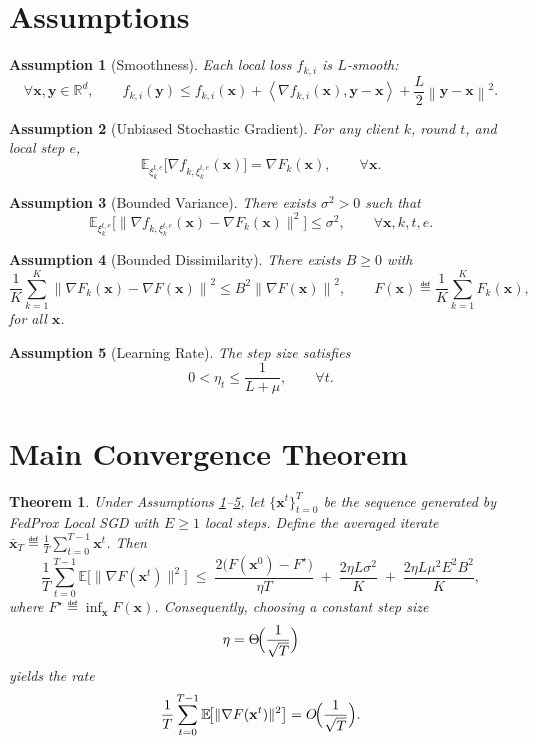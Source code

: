\documentclass{article}
\newtheorem{assumption}{Assumption}
\newtheorem{theorem}{Theorem}
\newcommand{\E}{\mathbb{E}}
\newcommand{\norm}[1]{\left\lVert #1 \right\rVert}
\newcommand{\inner}[2]{\left\langle #1,#2 \right\rangle}
\begin{document}
\section*{Assumptions}
\begin{assumption}[Smoothness]\label{ass:smooth}
Each local loss $f_{k,i}$ is $L$‑smooth:
\[
\forall \mathbf{x},\mathbf{y}\in\mathbb{R}^d,\qquad
f_{k,i}(\mathbf{y})\le f_{k,i}(\mathbf{x})
+\inner{\nabla f_{k,i}(\mathbf{x})}{\mathbf{y}-\mathbf{x}}
+\frac{L}{2}\norm{\mathbf{y}-\mathbf{x}}^{2}.
\]
\end{assumption}
\begin{assumption}[Unbiased Stochastic Gradient]\label{ass:unbiased}
For any client $k$, round $t$, and local step $e$,
\[
\E_{\xi_{k}^{t,e}}\!\bigl[\nabla f_{k,\xi_{k}^{t,e}}(\mathbf{x})\bigr]
=
\nabla F_k(\mathbf{x}) ,\qquad\forall \mathbf{x}.
\]
\end{assumption}
\begin{assumption}[Bounded Variance]\label{ass:variance}
There exists $\sigma^{2}>0$ such that
\[
\E_{\xi_{k}^{t,e}}\!\bigl[\|\nabla f_{k,\xi_{k}^{t,e}}(\mathbf{x})-\nabla F_k(\mathbf{x})\|^{2}\bigr]
\le\sigma^{2},\qquad\forall \mathbf{x},k,t,e.
\]
\end{assumption}
\begin{assumption}[Bounded Dissimilarity]\label{ass:dissim}
There exists $B\ge0$ with
\[
\frac{1}{K}\sum_{k=1}^{K}\norm{\nabla F_k(\mathbf{x})-\nabla F(\mathbf{x})}^{2}
\le B^{2}\norm{\nabla F(\mathbf{x})}^{2},
\qquad
F(\mathbf{x})\eqdef\frac{1}{K}\sum_{k=1}^{K}F_k(\mathbf{x}),
\]
for all $\mathbf{x}$.
\end{assumption}
\begin{assumption}[Learning Rate]\label{ass:lr}
The step size satisfies
\[
0<\eta_t\le\frac{1}{L+\mu},\qquad\forall t.
\]
\end{assumption}

\section*{Main Convergence Theorem}
\begin{theorem}\label{thm:main}
Under Assumptions \ref{ass:smooth}–\ref{ass:lr}, let $\{\mathbf{x}^{t}\}_{t=0}^{T}$ be the sequence generated by FedProx Local SGD with $E\ge1$ local steps.
Define the averaged iterate $\bar{\mathbf{x}}_{T}\eqdef\frac{1}{T}\sum_{t=0}^{T-1}\mathbf{x}^{t}$.
Then
\[
\frac{1}{T}\sum_{t=0}^{T-1}\E\!\bigl[\|\nabla F(\mathbf{x}^{t})\|^{2}\bigr]
\;\le\;
\frac{2\bigl(F(\mathbf{x}^{0})-F^{\star}\bigr)}{\eta T}
\;+\;
\frac{2\eta L\sigma^{2}}{K}
\;+\;
\frac{2\eta L\mu^{2}E^{2}B^{2}}{K},
\tag{1}
\]
where $F^{\star}\eqdef\inf_{\mathbf{x}}F(\mathbf{x})$.
Consequently, choosing a constant step size
\[
\eta=\Theta\!\Bigl(\frac{1}{\sqrt{T}}\Bigr)
\]
yields the rate
\[
\frac{1}{T}\sum_{t=0}^{T-1}\E\!\bigl[\|\nabla F(\mathbf{x}^{t})\|^{2}\bigr]
=O\!\Bigl(\frac{1}{\sqrt{T}}\Bigr).
\]
\end{theorem}
\end{document}
